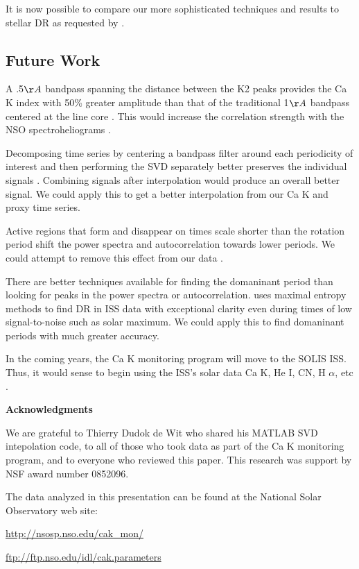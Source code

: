 \documentclass[preprint2]{aastex}
\begin{document}
It is now possible to compare our more sophisticated techniques and results to stellar DR as requested by \cite{bali85}.

\subsection{Future Work}

A .5$\AA$ bandpass spanning the distance between the K2 peaks provides the Ca K index with 50\% greater amplitude than that of the traditional 1$\AA$ bandpass centered at the line core \citep{livi07}. This would increase the correlation strength with the NSO spectroheliograms \citep{word98}.

Decomposing time series by centering a bandpass filter around each periodicity of interest and then performing the SVD separately better preserves the individual signals \citep{wit11}. Combining signals after interpolation would produce an overall better signal. We could apply this to get a better interpolation from our Ca K and proxy time series.

Active regions that form and disappear on times scale shorter than the rotation period shift the power spectra and autocorrelation towards lower periods. We could attempt to remove this effect from our data \citep{stim82}.

There are better techniques available for finding the domaninant period than looking for peaks in the power spectra or autocorrelation. \cite{bert12} uses maximal entropy methods to find DR in ISS data with exceptional clarity even during times of low signal-to-noise such as solar maximum. We could apply this to find domaninant periods with much greater accuracy. 

In the coming years, the Ca K monitoring program will move to the SOLIS ISS. Thus, it would sense to begin using the ISS's solar data Ca K, He I, CN, H $\alpha$, etc \citep{bert11}.

\textbf{Acknowledgments}

We are grateful to Thierry Dudok de Wit who shared his MATLAB SVD intepolation code, to all of those who took data as part of the Ca K monitoring program, and to everyone who reviewed this paper. This research was support by NSF award number 0852096.

The data analyzed in this presentation can be found at the National Solar Observatory web site:

\noindent
\url{http://nsosp.nso.edu/cak_mon/}

\noindent
\url{ftp://ftp.nso.edu/idl/cak.parameters} 
 
\end{document}

